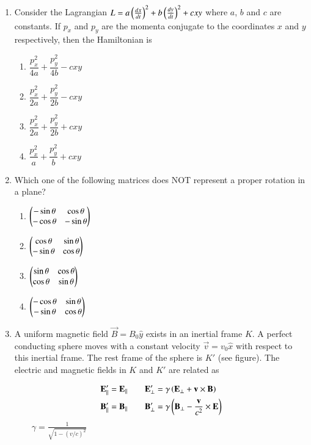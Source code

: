 \documentclass[journal,12pt,onecolumn]{IEEEtran}
\theoremstyle{remark}
\begin{document}
\begin{enumerate}
    \item Consider the Lagrangian
    $
        L = a \left(\frac{dx}{dt}\right)^2 + b\left(\frac{dy}{dt}\right)^2 + cxy
    $
    where $a$, $b$ and $c$ are constants. If $p_x$ and $p_y$ are the momenta conjugate to the coordinates $x$ and $y$ respectively, then the Hamiltonian is
    
    \begin{enumerate}
        \item $\dfrac{p_x^2}{4a} + \dfrac{p_y^2}{4b} - cxy$
        \item $\dfrac{p_x^2}{2a} + \dfrac{p_y^2}{2b} - cxy$
        \item $\dfrac{p_x^2}{2a} + \dfrac{p_y^2}{2b} + cxy$
        \item $\dfrac{p_x^2}{a} + \dfrac{p_y^2}{b} + cxy$
    \end{enumerate}
    

    \item Which one of the following matrices does NOT represent a proper rotation in a plane?
    
    \begin{enumerate}
        \item $
        \begin{pmatrix}
        -\sin\theta & \cos\theta \\
        -\cos\theta & -\sin\theta
        \end{pmatrix}
        $
        \item $
        \begin{pmatrix}
        \cos\theta & \sin\theta \\
        -\sin\theta & \cos\theta
        \end{pmatrix}
        $
        \item $
        \begin{pmatrix}
        \sin\theta & \cos\theta \\
        \cos\theta & \sin\theta
        \end{pmatrix}
        $
        \item $
        \begin{pmatrix}
        -\cos\theta & \sin\theta \\
        -\sin\theta & \cos\theta
        \end{pmatrix}$
    \end{enumerate}
    
     \item A uniform magnetic field $\vec{B} = B_0 \hat{y}$ exists in an inertial frame $K$. A perfect conducting sphere moves with a constant velocity $\vec{v} = v_0 \hat{x}$ with respect to this inertial frame. The rest frame of the sphere is $K'$ (see figure). The electric and magnetic fields in $K$ and $K'$ are related as
    
    \begin{align}
    \mathbf{E}'_{||} &= \mathbf{E}_{||} \qquad \mathbf{E}'_{\perp} = \gamma\left(\mathbf{E}_{\perp} + \mathbf{v} \times \mathbf{B}\right)  \\
    \mathbf{B}'_{||} &= \mathbf{B}_{||} \qquad
    \mathbf{B}'_{\perp} = \gamma \left( \mathbf{B}_{\perp} - \frac{\mathbf{v}}{c^2} \times \mathbf{E}\right)
    \end{align}
    $\qquad
    \gamma = \frac{1}{\sqrt{1 - (v/c)^2}}$
    

\end{enumerate}
\end{document}

